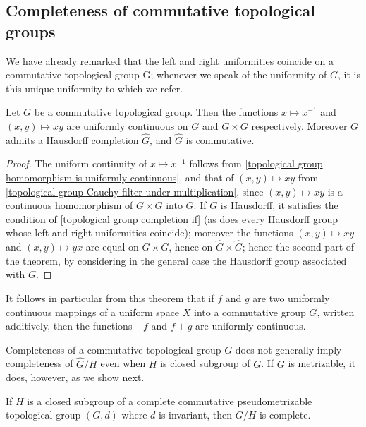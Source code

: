 \subsection{Completeness of commutative topological groups}
We have already remarked that the left and right uniformities coincide on a commutative topological group G; whenever we speak of the uniformity of $G$, it is this unique uniformity to which we refer.
\begin{theorem}\label{topological group commutative completion}
Let $G$ be a commutative topological group. Then the functions $x\mapsto x^{-1}$ and $(x,y)\mapsto xy$ are uniformly continuous on $G$ and $G\times G$ respectively. Moreover $G$ admits a Hausdorff completion $\widehat{G}$, and $\widehat{G}$ is commutative.
\end{theorem}
\begin{proof}
The uniform continuity of $x\mapsto x^{-1}$ follows from \cref{topological group homomorphism is uniformly continuous}, and that of $(x,y)\mapsto xy$ from \cref{topological group Cauchy filter under multiplication}, since $(x,y)\mapsto xy$ is a continuous homomorphism of $G\times G$ into $G$. If $G$ is Hausdorff, it satisfies the condition of \cref{topological group completion if} (as does every Hausdorff group whose left and right uniformities coincide); moreover the functions $(x,y)\mapsto xy$ and $(x,y)\mapsto yx$ are equal on $G\times G$, hence on $\widehat{G}\times\widehat{G}$; hence the second part of the theorem, by considering in the general case the Hausdorff group associated with $G$.
\end{proof}
It follows in particular from this theorem that if $f$ and $g$ are two uniformly continuous mappings of a uniform space $X$ into a commutative group $G$, written additively, then the functions $-f$ and $f+g$ are uniformly continuous.\par
Completeness of a commutative topological group $G$ does not generally imply completeness of $\widehat{G}/H$ even when $H$ is closed subgroup of $G$. If $G$ is metrizable, it does, however, as we show next.
\begin{proposition}\label{topological group metric quotient is complete}
If $H$ is a closed subgroup of a complete commutative pseudometrizable topological group $(G,d)$ where $d$ is invariant, then $G/H$ is complete.
\end{proposition}
